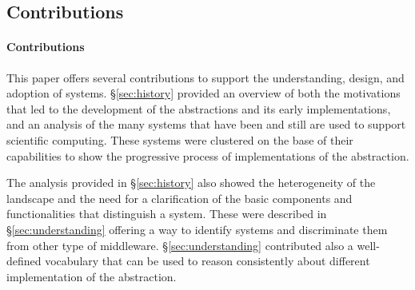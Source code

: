 \documentclass{sig-alternate}
\begin{document}

%
\subsection{Contributions}
\label{sec:contributions}


\paragraph*{Contributions} 



This paper offers several contributions to support the understanding, design,
and adoption of \pilot systems. \S\ref{sec:history} provided an overview of both
the motivations that led to the development of the \pilot abstractions and its
early implementations, and an analysis of the many \pilot systems that have been
and still are used to support scientific computing. These systems were clustered
on the base of their capabilities to show the progressive process of
implementations of the \pilot abstraction.

The analysis provided in \S\ref{sec:history} also showed the heterogeneity of
the \pilot landscape and the need for a clarification of the basic components
and functionalities that distinguish a \pilot system. These were described in
\S\ref{sec:understanding} offering a way to identify \pilot systems and
discriminate them from other type of middleware. \S\ref{sec:understanding}
contributed also a well-defined vocabulary that can be used to reason
consistently about different implementation of the \pilot abstraction.
\end{document}
